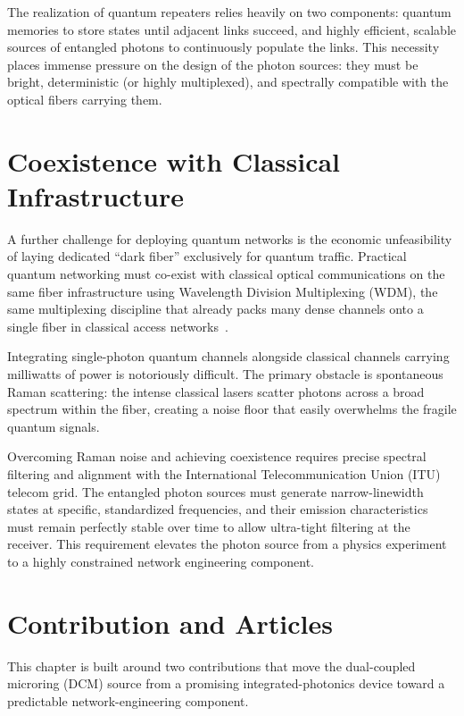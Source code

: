 The realization of quantum repeaters relies heavily on two components: quantum memories to store states until adjacent links succeed, and highly efficient, scalable sources of entangled photons to continuously populate the links. This necessity places immense pressure on the design of the photon sources: they must be bright, deterministic (or highly multiplexed), and spectrally compatible with the optical fibers carrying them.

\section{Coexistence with Classical Infrastructure}
\label{sec:qsrc-coexistence}

A further challenge for deploying quantum networks is the economic unfeasibility of laying dedicated ``dark fiber'' exclusively for quantum traffic. Practical quantum networking must co-exist with classical optical communications on the same fiber infrastructure using Wavelength Division Multiplexing (WDM), the same multiplexing discipline that already packs many dense channels onto a single fiber in classical access networks~\cite{spolitis2014wdmpon}. 

Integrating single-photon quantum channels alongside classical channels carrying milliwatts of power is notoriously difficult. The primary obstacle is spontaneous Raman scattering: the intense classical lasers scatter photons across a broad spectrum within the fiber, creating a noise floor that easily overwhelms the fragile quantum signals.

Overcoming Raman noise and achieving coexistence requires precise spectral filtering and alignment with the International Telecommunication Union (ITU) telecom grid. The entangled photon sources must generate narrow-linewidth states at specific, standardized frequencies, and their emission characteristics must remain perfectly stable over time to allow ultra-tight filtering at the receiver. This requirement elevates the photon source from a physics experiment to a highly constrained network engineering component.

\section{Contribution and Articles}

This chapter is built around two contributions that move the dual-coupled microring (DCM) source from a promising integrated-photonics device toward a predictable network-engineering component.

